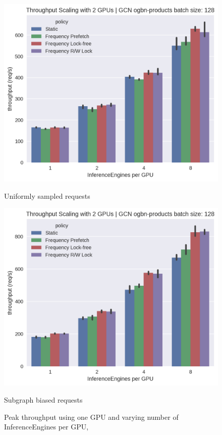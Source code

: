 \begin{figure}[h!]
    \centering
    \begin{minipage}[c]{0.48\textwidth}
        \centering
        \includegraphics[width=\textwidth]{figures/throughput_GCN_uniform_pinnedc0.2_gpus_2.png}
        \caption*{Uniformly sampled requests}
    \end{minipage}
    \hfill
    \begin{minipage}[c]{0.48\textwidth}
        \centering
        \includegraphics[width=\textwidth]{figures/throughput_GCN_bias_0.8_pinnedc0.2_gpus_2.png}    
        \caption*{Subgraph biased requests}
    \end{minipage}
    \caption{Peak throughput using one GPU and varying number of InferenceEngines per GPU,}
    \label{Eval: Throughput 2 GPU}
\end{figure}   

